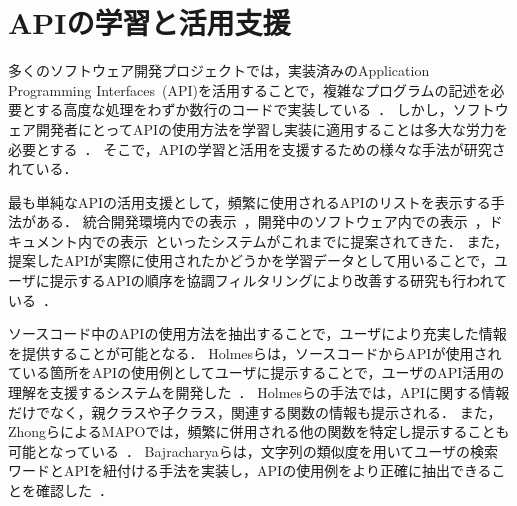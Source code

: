 

\section{APIの学習と活用支援}

多くのソフトウェア開発プロジェクトでは，実装済みのApplication Programming Interfaces~(API)を活用することで，複雑なプログラムの記述を必要とする高度な処理をわずか数行のコードで実装している~\cite{Patterns_for_API_migration}．
しかし，ソフトウェア開発者にとってAPIの使用方法を学習し実装に適用することは多大な労力を必要とする~\cite{robillard2011field}．
そこで，APIの学習と活用を支援するための様々な手法が研究されている．

最も単純なAPIの活用支援として，頻繁に使用されるAPIのリストを表示する手法がある．
統合開発環境内での表示~\cite{Holmes_2008_MSR_Eclipse_APIs}，開発中のソフトウェア内での表示~\cite{UIST_2009_CommunityCommands}，ドキュメント内での表示~\cite{VLHCC_2009_API_doc_API_usage}といったシステムがこれまでに提案されてきた．
また，提案したAPIが実際に使用されたかどうかを学習データとして用いることで，ユーザに提示するAPIの順序を協調フィルタリングにより改善する研究も行われている~\cite{colab_filtering_api_recommend}．

ソースコード中のAPIの使用方法を抽出することで，ユーザにより充実した情報を提供することが可能となる．
Holmesらは，ソースコードからAPIが使用されている箇所をAPIの使用例としてユーザに提示することで，ユーザのAPI活用の理解を支援するシステムを開発した~\cite{Holmes_2006_recommend_api_example}．
Holmesらの手法では，APIに関する情報だけでなく，親クラスや子クラス，関連する関数の情報も提示される．
また，ZhongらによるMAPOでは，頻繁に併用される他の関数を特定し提示することも可能となっている~\cite{extended_MAPO}．
Bajracharyaらは，文字列の類似度を用いてユーザの検索ワードとAPIを紐付ける手法を実装し，APIの使用例をより正確に抽出できることを確認した~\cite{Bajracharya:2010:LUS}．

